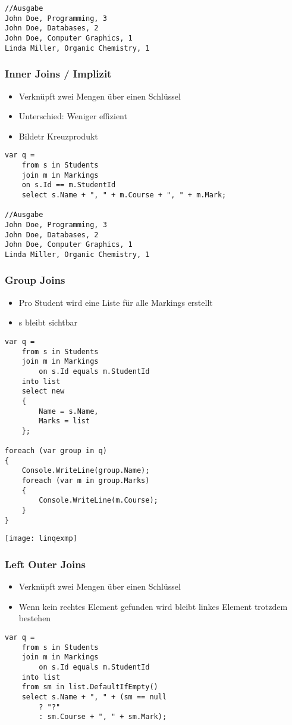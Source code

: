 \begin{multicols*}{2}
\begin{lstlisting}
//Ausgabe
John Doe, Programming, 3
John Doe, Databases, 2
John Doe, Computer Graphics, 1 
Linda Miller, Organic Chemistry, 1
\end{lstlisting}
\subsubsection{Inner Joins / Implizit}
\begin{itemize}
    \item Verknüpft zwei Mengen über einen Schlüssel
    \item Unterschied: Weniger effizient
    \item Bildetr Kreuzprodukt
\end{itemize}
\begin{lstlisting}
var q =
    from s in Students
    join m in Markings
    on s.Id == m.StudentId
    select s.Name + ", " + m.Course + ", " + m.Mark;

//Ausgabe
John Doe, Programming, 3
John Doe, Databases, 2
John Doe, Computer Graphics, 1 
Linda Miller, Organic Chemistry, 1
\end{lstlisting}
\subsubsection{Group Joins}
\begin{itemize}
    \item Pro Student wird eine Liste für alle Markings erstellt
    \item s bleibt sichtbar
\end{itemize}
\begin{lstlisting}
var q =
    from s in Students 
    join m in Markings
        on s.Id equals m.StudentId
    into list
    select new
    {
        Name = s.Name,
        Marks = list
    };

foreach (var group in q) 
{
    Console.WriteLine(group.Name);
    foreach (var m in group.Marks)
    {
        Console.WriteLine(m.Course);
    }
}
\end{lstlisting}
\texttt{[image: linqexmp]}
\subsubsection{Left Outer Joins}
\begin{itemize}
    \item Verknüpft zwei Mengen über einen Schlüssel
    \item Wenn kein rechtes Element gefunden wird bleibt linkes Element trotzdem bestehen
\end{itemize}
\begin{lstlisting}
var q =
    from s in Students 
    join m in Markings
        on s.Id equals m.StudentId
    into list
    from sm in list.DefaultIfEmpty()
    select s.Name + ", " + (sm == null
        ? "?"
        : sm.Course + ", " + sm.Mark);


\end{lstlisting}
\end{multicols*}
